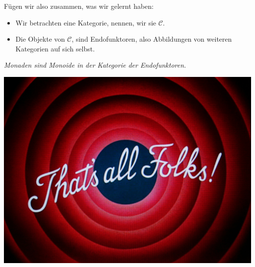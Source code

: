 \documentclass{beamer}
\begin{document}
\begin{frame}

Fügen wir also zusammen, was wir gelernt haben:

\begin{itemize}
\pause\item Wir betrachten eine Kategorie, nennen, wir sie $\mathcal{C}$.
\pause\item Die Objekte von $\mathcal{C}$, sind Endofunktoren, also Abbildungen von weiteren Kategorien auf sich selbst.
\end{itemize}

\begin{center}
\textit{\glqq Monaden sind Monoide in der Kategorie der Endofunktoren.\grqq}
\end{center}

\end{frame}


\begin{frame}
\begin{center}
\includegraphics[scale=0.25]{thatsall.jpg} 
\end{center}
\end{frame}
\end{document}
